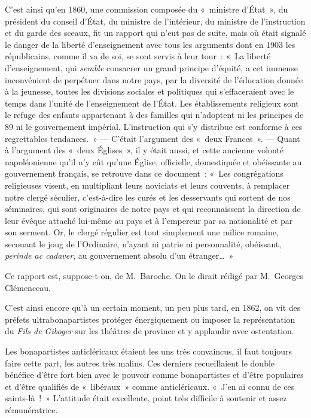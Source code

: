 \documentclass[french,twoside]{book} %
\begin{document}
C’est ainsi qu’en 1860, une commission composée du « ministre d’État », du président du conseil d’État, du ministre de l’intérieur, du ministre de l’instruction et du garde des sceaux, fit un rapport qui n’eut pas de suite, mais où était signalé le danger de la liberté d’enseignement avec tous les arguments dont en 1903 les républicains, comme  il va de soi, se sont servis à leur tour : « La liberté d’enseignement, qui {\itshape semble} consacrer un grand principe d’équité, a cet immense inconvénient de perpétuer dans notre pays, par la diversité de l’éducation donnée à la jeunesse, toutes les divisions sociales et politiques qui s’effaceraient avec le temps dans l’unité de l’enseignement de l’État. Les établissements religieux sont le refuge des enfants appartenant à des familles qui n’adoptent ni les principes de 89 ni le gouvernement impérial. L’instruction qui s’y distribue est conforme à ces regrettables tendances. » — C’était l’argument des « deux Frances ». — Quant à l’argument des « deux Églises », il y était aussi, et cette ancienne volonté napoléonienne qu’il n’y eût qu’une Église, officielle, domestiquée et obéissante au gouvernement français, se retrouve dans ce document : « Les congrégations religieuses visent, en multipliant leurs noviciats et leurs couvents, à remplacer notre clergé séculier, c’est-à-dire les curés et les desservants qui sortent de nos séminaires, qui sont originaires de notre pays et qui reconnaissent la direction de leur évêque attaché lui-même au pays et à l’empereur par sa nationalité et par son serment. Or, le clergé régulier est tout simplement une milice romaine, secouant le joug de l’Ordinaire, n’ayant ni patrie ni personnalité, obéissant,  {\itshape perinde ac cadaver}, au gouvernement absolu d’un étranger… »\par
Ce rapport est, suppose-t-on, de M. Baroche. On le dirait rédigé par M. Georges Clémenceau.\par
C’est ainsi encore qu’à un certain moment, un peu plus tard, en 1862, on vit des préfets ultrabonapartistes protéger énergiquement ou imposer la représentation du \emph{Fils de Giboger} sur les théâtres de province et y applaudir avec ostentation.\par
Les bonapartistes anticléricaux étaient les uns très convaincus, il faut toujours faire cette part, les autres très malins. Ces derniers recueillaient le double bénéfice d’être fort bien avec le pouvoir comme bonapartistes et d’être populaires et d’être qualifiés de « libéraux » comme anticléricaux. « J’en ai connu de ces saints-là ! » L’attitude était excellente, point très difficile à soutenir et assez rémunératrice.\par
\end{document}
